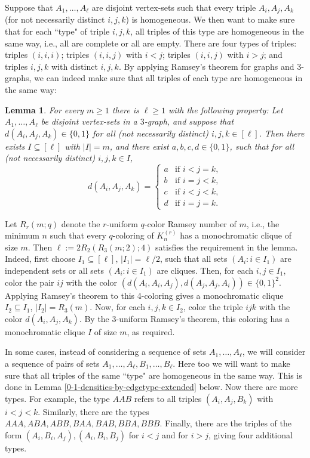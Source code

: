 \documentclass[11pt]{article}
\let\oldendproof\endproof
\renewenvironment{proof}[1][\proofname]{%
	\oldproof[\bf #1]%
}{\oldendproof}
\theoremstyle{plain}
\newtheorem{lemma}[theorem]{Lemma}
\begin{document}
Suppose that $A_1,\dots,A_{\ell}$ are disjoint vertex-sets such that every triple $A_i,A_j,A_k$ (for not necessarily distinct $i,j,k$) is homogeneous. We then want to make sure that for each ``type" of triple $i,j,k$, all triples of this type are homogeneous in the same way, i.e., all are complete or all are empty. There are four types of triples: triples $(i,i,i)$; triples $(i,i,j)$ with $i < j$; triples $(i,i,j)$ with $i > j$; and triples $i,j,k$ with distinct $i,j,k$. By applying Ramsey's theorem for graphs and 3-graphs, we can indeed make sure that all triples of each type are homogeneous in the same way:

\begin{lemma} \label{0-1-densities-by-edgetype}
    For every $m \geq 1$ there is $\ell \geq 1$ with the following property: Let 
    $A_1, \dots, A_{\ell}$ be disjoint vertex-sets in a $3$-graph, and suppose that $d(A_i,A_j,A_k) \in \{0,1\}$ for all (not necessarily distinct) $i,j,k \in [\ell]$. Then there exists $I \subseteq [\ell]$ with $|I|=m$, and there exist $a,b,c,d \in \{0,1\}$, such that for all (not necessarily distinct) $i,j,k \in I$, 
    $$d(A_i,A_j,A_k) = \begin{cases}
    a &\text{if } i<j=k,\\
    b &\text{if } i=j<k,\\
    c &\text{if } i<j<k,\\
    d &\text{if } i=j=k.
    \end{cases}$$
\end{lemma}
\begin{proof}
Let $R_r(m;q)$ denote the $r$-uniform $q$-color Ramsey number of $m$, i.e., the minimum $n$ such that every $q$-coloring of $K_n^{(r)}$ has a monochromatic clique of size $m$. 
Then $\ell := 2 R_2(R_3(m;2);4)$ satisfies the requirement in the lemma. Indeed, first choose $I_1 \subseteq [\ell]$, $|I_1| = \ell/2$, such that all sets $(A_i : i \in I_1)$ are independent sets or all sets $(A_i : i \in I_1)$ are cliques. Then, for each $i,j \in I_1$, color the pair $ij$ with the color $(d(A_i,A_i,A_j),d(A_j,A_j,A_i)) \in \{0,1\}^2$. Applying Ramsey's theorem to this 4-coloring gives a monochromatic clique $I_2 \subseteq I_1$, $|I_2| = R_3(m)$. Now, for each $i,j,k \in I_2$, color the triple $ijk$ with the color $d(A_i,A_j,A_k)$. By the 3-uniform Ramsey's theorem, this coloring has a monochromatic clique $I$ of size $m$, as required. 
\end{proof}

In some cases, instead of considering a sequence of sets $A_1,\dots,A_{\ell}$, we will consider a sequence of pairs of sets $A_1,\dots,A_{\ell},B_1,\dots,B_{\ell}$. Here too we will want to make sure that all triples of the same ``type" are homogeneous in the same way. This is done in Lemma \ref{0-1-densities-by-edgetype-extended} below. Now there are more types. For example, the type $AAB$ refers to all triples $(A_i,A_j,B_k)$ with $i < j < k$. Similarly, there are the types $AAA,ABA,ABB,BAA,BAB,BBA,BBB$. Finally, there are the triples of the form \linebreak $(A_i,B_i,A_j),(A_i,B_i,B_j)$ for $i < j$ and for $i > j$, giving four additional types. 
\end{document}
